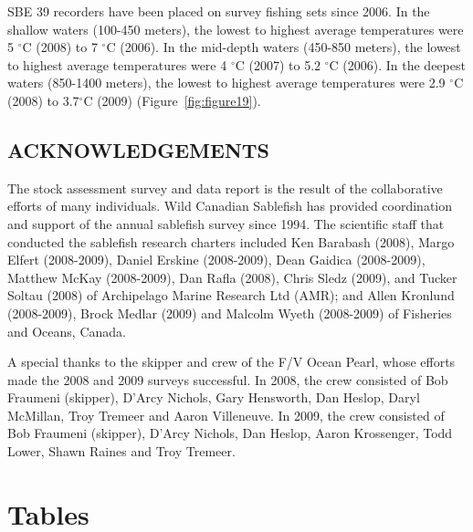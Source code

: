 \documentclass[12pt]{article}\usepackage[]{graphicx}\usepackage[]{color}
\begin{document}
SBE 39 recorders have been placed on survey fishing sets since 2006. In the shallow waters (100-450 meters), the lowest to highest average temperatures were 5 \(^\circ\)C (2008) to 7 \(^\circ\)C (2006). In the mid-depth waters (450-850 meters), the lowest to highest average temperatures were 4 \(^\circ\)C (2007) to 5.2 \(^\circ\)C (2006). In the deepest waters (850-1400 meters), the lowest to highest average temperatures were 2.9 \(^\circ\)C (2008) to 3.7\(^\circ\)C (2009) (Figure~\ref{fig:figure19}).

\hypertarget{acknowledgements}{%
\subsection{ACKNOWLEDGEMENTS}\label{acknowledgements}}

The stock assessment survey and data report is the result of the collaborative efforts of many individuals. Wild Canadian Sablefish has provided coordination and support of the annual sablefish survey since 1994. The scientific staff that conducted the sablefish research charters included Ken Barabash (2008), Margo Elfert (2008-2009), Daniel Erskine (2008-2009), Dean Gaidica (2008-2009), Matthew McKay (2008-2009), Dan Rafla (2008), Chris Sledz (2009), and Tucker Soltau (2008) of Archipelago Marine Research Ltd (AMR); and Allen Kronlund (2008-2009), Brock Medlar (2009) and Malcolm Wyeth (2008-2009) of Fisheries and Oceans, Canada.

A special thanks to the skipper and crew of the F/V Ocean Pearl, whose efforts made the 2008 and 2009 surveys successful. In 2008, the crew consisted of Bob Fraumeni (skipper), D'Arcy Nichols, Gary Hensworth, Dan Heslop, Daryl McMillan, Troy Tremeer and Aaron Villeneuve. In 2009, the crew consisted of Bob Fraumeni (skipper), D'Arcy Nichols, Dan Heslop, Aaron Krossenger, Todd Lower, Shawn Raines and Troy Tremeer.

\clearpage

\hypertarget{tables}{%
\section{Tables}\label{tables}}
\end{document}
